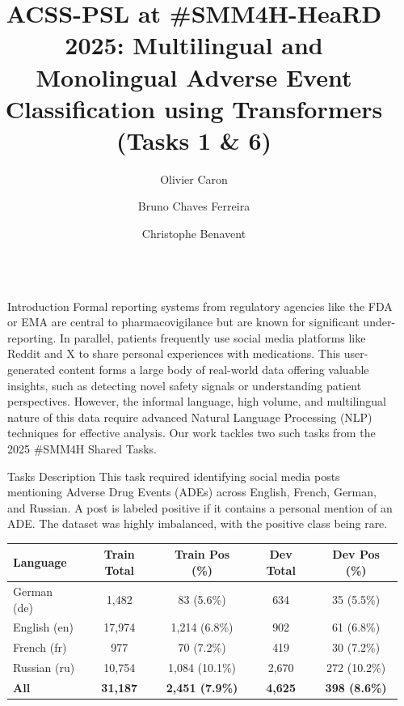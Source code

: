 \documentclass[final]{beamer}
\title{ACSS-PSL at {\#}SMM4H-HeaRD 2025: Multilingual and Monolingual Adverse Event Classification using Transformers (Tasks 1 \& 6)}
\author{Olivier Caron \inst{1} \and Bruno Chaves Ferreira \inst{1} \and Christophe Benavent \inst{1}}
\institute[DRM, PSL]{\inst{1} DRM, Paris-Dauphine University, PSL University, CNRS, 75016 Paris, France}
\newlength{\sepwidth}
\newlength{\colwidth}
\newcommand{\separatorcolumn}{\begin{column}{\sepwidth}\end{column}}
\begin{document}
\begin{frame}[t] 
\begin{columns}[t]
\separatorcolumn

\begin{column}{\colwidth}

  \begin{block}{Introduction}
    Formal reporting systems from regulatory agencies like the FDA or EMA are central to pharmacovigilance but are known for significant under-reporting. In parallel, patients frequently use social media platforms like Reddit and X to share personal experiences with medications. This user-generated content forms a large body of real-world data offering valuable insights, such as detecting novel safety signals or understanding patient perspectives. However, the informal language, high volume, and multilingual nature of this data require advanced Natural Language Processing (NLP) techniques for effective analysis. Our work tackles two such tasks from the 2025 {\#}SMM4H Shared Tasks.
  \end{block}
  
  \vfill %

  \begin{block}{Tasks Description}
    This task required identifying social media posts mentioning Adverse Drug Events (ADEs) across English, French, German, and Russian. A post is labeled positive if it contains a personal mention of an ADE. The dataset was highly imbalanced, with the positive class being rare.
    \begin{center}
    \begin{tabular}{lcccc}
    \toprule
    \textbf{Language} & \textbf{Train Total} & \textbf{Train Pos (\%)} & \textbf{Dev Total} & \textbf{Dev Pos (\%)} \\
    \midrule
    German (de)  & 1,482  & 83 (5.6\%)   & 634  & 35 (5.5\%)  \\
    English (en) & 17,974 & 1,214 (6.8\%) & 902  & 61 (6.8\%)  \\
    French (fr)  & 977    & 70 (7.2\%)    & 419  & 30 (7.2\%)  \\
    Russian (ru) & 10,754 & 1,084 (10.1\%) & 2,670 & 272 (10.2\%) \\
    \midrule
    \textbf{All} & \textbf{31,187} & \textbf{2,451 (7.9\%)} & \textbf{4,625} & \textbf{398 (8.6\%)} \\
    \bottomrule
    \end{tabular}
    \end{center}


\end{block}
\end{column}
\end{columns}
\end{frame}
\end{document}
